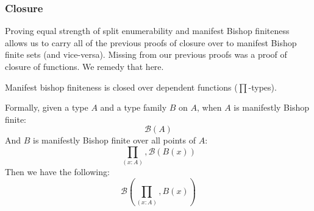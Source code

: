 \subsubsection{Closure}
Proving equal strength of split enumerability and manifest Bishop finiteness
allows us to carry all of the previous proofs of closure over to manifest Bishop
finite sets (and vice-versa).
Missing from our previous proofs was a proof of closure of functions.
We remedy that here.
\begin{theorem}
  Manifest bishop finiteness is closed over dependent functions (\(\prod\)-types).

  Formally, given a type \(A\) and a type family \(B\) on \(A\), when \(A\) is
  manifestly Bishop finite:
  \begin{equation}
    \mathcal{B}\left( A \right)
  \end{equation}
  And \(B\) is manifestly Bishop finite over all points of \(A\):
  \begin{equation}
    \prod_{(x : A)} , \mathcal{B}\left( B(x) \right)
  \end{equation}
  Then we have the following:
  \begin{equation}
    \mathcal{B}\left(\prod_{(x : A)} , B(x)\right)
  \end{equation}
\end{theorem}
